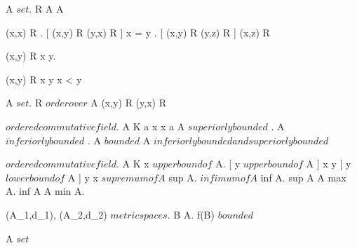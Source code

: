 {

	{
	{
		A $ set$.
		R \subset A \times A
	}

	{
		{
			(x,x) \in R
		}.
		[ (x,y) \in R \logicand (y,x) \in R ]
		{
			x = y
		}.
		[ (x,y) \in R \logicand (y,z) \in R ]
		{
			(x,z) \in R
		}
	}

	\denote
	{
		(x,y) \in R \as x \leq y.

		(x,y) \in R \logicand x \neq y \as x < y
	}	}

	{
	{
		A $ set$.
		R $ order over $ A
	}
	{
		{
			(x,y) \in R \logicor (y,x) \in R
		}
	}

	}

	{
	{
		\K $ ordered commutative field $.
		A \subset K
	}
	{
		{
			a \leq x
		}
	}	
	{
		{
			x \leq a
		}
	}
	\denote
	{
		A $ superiorly bounded $ \as {}.
		A $ inferiorly bounded $ \as {}.
		A $ bounded $ \as A $ inferiorly bounded  and superiorly bounded $
	}

	}

	{
	{
		\K $ ordered commutative field $.
		A \subset K
	}
	{
		x $ upper bound of $ A.
		[ y $ upper bound of $ A ]
		{
			x \leq y
		}
	}	
	{
		[ y $ lower bound of $ A ]
		{
			y \leq x
		}
	}
	\denote
	{
		$ supremum of A $ \as sup A.
		$ infimum of A $  \as inf A.
		sup A \in A \as max A.
		inf A \in A \as min A.
	}

	}

	{
	{
		(A_1,d_1), (A_2,d_2) $ metric spaces $.
		B \subset A.
	}
	{
		f(B) $ bounded $
	}	}

	{
	{
		A $ set $
	}
	{
	}
	\denote
	{
		 \as {} 
	}
	
	}
}



